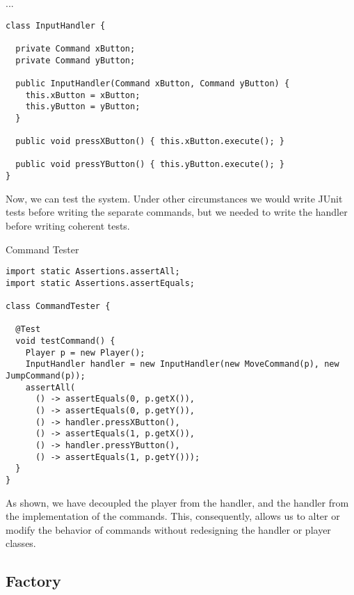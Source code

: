 \begin{cl}{...}
\begin{lstlisting}[language=MyJava]
class InputHandler {

  private Command xButton;
  private Command yButton;

  public InputHandler(Command xButton, Command yButton) {
    this.xButton = xButton;
    this.yButton = yButton;
  }

  public void pressXButton() { this.xButton.execute(); }

  public void pressYButton() { this.yButton.execute(); }
}
\end{lstlisting}
\end{cl}

Now, we can test the system. Under other circumstances we would write JUnit tests before writing the separate commands, but we needed to write the handler before writing coherent tests. 

\begin{cl}{Command Tester}
\begin{lstlisting}[language=MyJava]
import static Assertions.assertAll;
import static Assertions.assertEquals;

class CommandTester {

  @Test
  void testCommand() {
    Player p = new Player();
    InputHandler handler = new InputHandler(new MoveCommand(p), new JumpCommand(p));
    assertAll(
      () -> assertEquals(0, p.getX()),
      () -> assertEquals(0, p.getY()),
      () -> handler.pressXButton(),
      () -> assertEquals(1, p.getX()),
      () -> handler.pressYButton(),
      () -> assertEquals(1, p.getY()));
  }
}
\end{lstlisting}
\end{cl}

As shown, we have decoupled the player from the handler, and the handler from the implementation of the commands. This, consequently, allows us to alter or modify the behavior of commands without redesigning the handler or player classes.

\subsection*{Factory}


